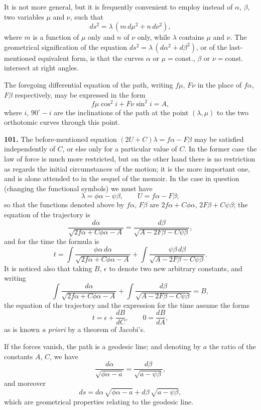 \documentclass[11pt,a4paper]{book}
\begin{document}
It is not more general, but it is frequently convenient to employ instead of $\alpha$, $\beta$, two variables $\mu$ and $\nu$, such that
\[
ds^2 = \lambda\,(m\,d\mu^2 + n\,d\nu^2),
\]
where $m$ is a function of $\mu$ only and $n$ of $\nu$ only, while $\lambda$ contains $\mu$ and $\nu$. The geometrical signification of the equation $ds^2 = \lambda\,(d\alpha^2 + d\beta^2)$, or of the last-mentioned equivalent form, is that the curves $\alpha$ or $\mu = \text{const.}$, $\beta$ or $\nu = \text{const.}$ intersect at right angles.

The foregoing differential equation of the path, writing $f\mu$, $F\nu$ in the place of $f\alpha$, $F\beta$ respectively, may be expressed in the form
\[
f\mu \cos^2 i + F\nu \sin^2 i = A,
\]
where $i$, $90^\circ - i$ are the inclinations of the path at the point $(\lambda, \mu)$ to the two orthotomic curves through this point.

\textbf{101.} The before-mentioned equation $(2U + C)\lambda = f\alpha - F\beta$ may be satisfied independently of $C$, or else only for a particular value of $C$. In the former case the law of force is much more restricted, but on the other hand there is no restriction as regards the initial circumstances of the motion; it is the more important one, and is alone attended to in the sequel of the memoir. In the case in question (changing the functional symbols) we must have
\[
\lambda = \phi\alpha - \psi\beta, \qquad U = f\alpha - F\beta;
\]
so that the functions denoted above by $f\alpha$, $F\beta$ are $2f\alpha + C\phi\alpha$, $2F\beta + C\psi\beta$; the equation of the trajectory is
\[
\frac{d\alpha}{\sqrt{2f\alpha + C\phi\alpha - A}} = \frac{d\beta}{\sqrt{A - 2F\beta - C\psi\beta}},
\]
and for the time the formula is
\[
t = \int \frac{\phi\alpha\,d\alpha}{\sqrt{2f\alpha + C\phi\alpha - A}} + \int \frac{\psi\beta\,d\beta}{\sqrt{A - 2F\beta - C\psi\beta}}.
\]
It is noticed also that taking $B$, $\epsilon$ to denote two new arbitrary constants, and writing
\[
\int \frac{d\alpha}{\sqrt{2f\alpha + C\phi\alpha - A}} + \int \frac{d\beta}{\sqrt{A - 2F\beta - C\psi\beta}} = B,
\]
the equation of the trajectory and the expression for the time assume the forms
\[
t = \epsilon + \frac{dB}{dC}, \qquad 0 = \frac{dB}{dA},
\]
as is known \textit{a priori} by a theorem of Jacobi's.

If the forces vanish, the path is a geodesic line; and denoting by $a$ the ratio of the constants $A$, $C$, we have
\[
\frac{d\alpha}{\sqrt{\phi\alpha - a}} = \frac{d\beta}{\sqrt{a - \psi\beta}},
\]
and moreover
\[
ds = d\alpha\,\sqrt{\phi\alpha - a} + d\beta\,\sqrt{a - \psi\beta},
\]
which are geometrical properties relating to the geodesic line.
\end{document}
